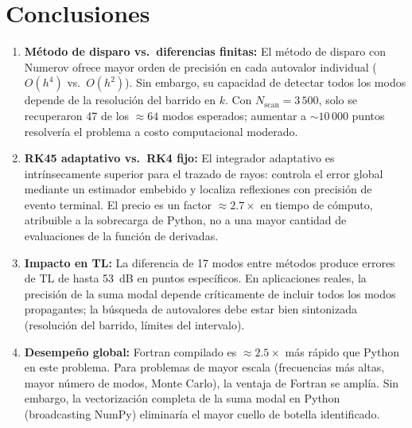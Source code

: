 \documentclass[12pt,a4paper]{article}
\begin{document}
\section{Conclusiones}

\begin{enumerate}
  \item \textbf{Método de disparo vs.\ diferencias finitas:} El método de
        disparo con Numerov ofrece mayor orden de precisión en cada autovalor
        individual ($O(h^4)$ vs.\ $O(h^2)$). Sin embargo, su capacidad de
        detectar todos los modos depende de la resolución del barrido en $k$.
        Con $N_{\text{scan}} = 3\,500$, solo se recuperaron 47 de los $\approx
        64$ modos esperados; aumentar a $\sim 10\,000$ puntos resolvería el
        problema a costo computacional moderado.

  \item \textbf{RK45 adaptativo vs.\ RK4 fijo:} El integrador adaptativo es
        intrínsecamente superior para el trazado de rayos: controla el error
        global mediante un estimador embebido y localiza reflexiones con
        precisión de evento terminal. El precio es un factor $\approx 2.7\times$
        en tiempo de cómputo, atribuible a la sobrecarga de Python, no a una
        mayor cantidad de evaluaciones de la función de derivadas.

  \item \textbf{Impacto en TL:} La diferencia de 17 modos entre métodos produce
        errores de TL de hasta 53~dB en puntos específicos. En aplicaciones
        reales, la precisión de la suma modal depende críticamente de incluir
        todos los modos propagantes; la búsqueda de autovalores debe estar
        bien sintonizada (resolución del barrido, límites del intervalo).

  \item \textbf{Desempeño global:} Fortran compilado es $\approx 2.5\times$
        más rápido que Python en este problema. Para problemas de mayor escala
        (frecuencias más altas, mayor número de modos, Monte Carlo), la
        ventaja de Fortran se amplía. Sin embargo, la vectorización completa
        de la suma modal en Python (broadcasting NumPy) eliminaría el mayor
        cuello de botella identificado.
\end{enumerate}

\appendix
\end{document}
